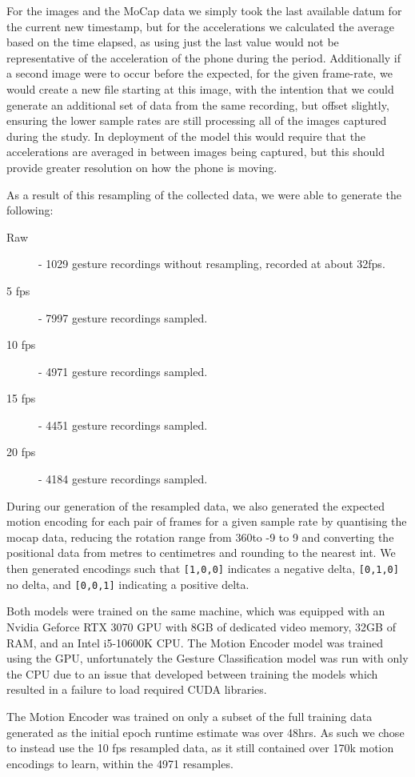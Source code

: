 For the images and the MoCap data we simply took the last available datum for the current new timestamp, but for the accelerations we calculated the average based on the time elapsed, as using just the last value would not be representative of the acceleration of the phone during the period.
Additionally if a second image were to occur before the expected, for the given frame-rate, we would create a new file starting at this image, with the intention that we could generate an additional set of data from the same recording, but offset slightly, ensuring the lower sample rates are still processing all of the images captured during the study.
In deployment of the model this would require that the accelerations are averaged in between images being captured, but this should provide greater resolution on how the phone is moving.

As a result of this resampling of the collected data, we were able to generate the following:
\begin{description}
    \item[Raw] - 1029 gesture recordings without resampling, recorded at about 32fps.
    \item[5 fps] - 7997 gesture recordings sampled.
    \item[10 fps] - 4971 gesture recordings sampled.
    \item[15 fps] - 4451 gesture recordings sampled.
    \item[20 fps] - 4184 gesture recordings sampled.
\end{description}
During our generation of the resampled data, we also generated the expected motion encoding for each pair of frames for a given sample rate by quantising the mocap data, reducing the rotation range from 360\textdegree to -9 to 9 and converting the positional data from metres to centimetres and rounding to the nearest int. We then generated encodings such that \verb|[1,0,0]| indicates a negative delta, \verb|[0,1,0]| no delta, and \verb|[0,0,1]| indicating a positive delta.

Both models were trained on the same machine, which was equipped with an Nvidia Geforce RTX 3070 GPU with 8GB of dedicated video memory, 32GB of RAM, and an Intel i5-10600K CPU.
The Motion Encoder model was trained using the GPU, unfortunately the Gesture Classification model was run with only the CPU due to an issue that developed between training the models which resulted in a failure to load required CUDA libraries. 

The Motion Encoder was trained on only a subset of the full training data generated as the initial epoch runtime estimate was over 48hrs. As such we chose to instead use the 10 fps resampled data, as it still contained over 170k motion encodings to learn, within the 4971 resamples.

